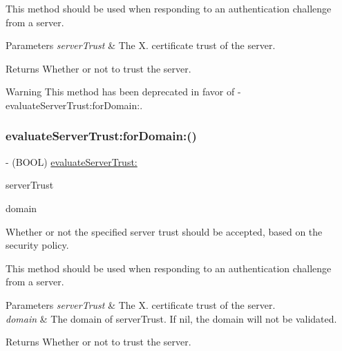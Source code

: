 This method should be used when responding to an authentication challenge from a server.


\begin{DoxyParams}{Parameters}
{\em server\+Trust} & The X. certificate trust of the server.\\
\hline
\end{DoxyParams}
\begin{DoxyReturn}{Returns}
Whether or not to trust the server.
\end{DoxyReturn}
\begin{DoxyWarning}{Warning}
This method has been deprecated in favor of {\ttfamily -\/evaluate\+Server\+Trust\+:for\+Domain\+:}. 
\end{DoxyWarning}
\mbox{\label{interface_a_f_security_policy_a892268d5a78bcf21d188486aca1aea56}} 
\subsubsection{\texorpdfstring{evaluate\+Server\+Trust\+:for\+Domain\+:()}{evaluateServerTrust:forDomain:()}\hspace{0.1cm}{\footnotesize\ttfamily [1/3]}}
{\footnotesize\ttfamily -\/ (B\+O\+OL) \mbox{\hyperlink{interface_a_f_security_policy_a404e83f245843cb7fd6408d5e9ee15e0}{evaluate\+Server\+Trust\+:}} \begin{DoxyParamCaption}\item[{(Sec\+Trust\+Ref)}]{server\+Trust }\item[{forDomain:(nullable N\+S\+String $\ast$)}]{domain }\end{DoxyParamCaption}}

Whether or not the specified server trust should be accepted, based on the security policy.

This method should be used when responding to an authentication challenge from a server.


\begin{DoxyParams}{Parameters}
{\em server\+Trust} & The X. certificate trust of the server. \\
\hline
{\em domain} & The domain of server\+Trust. If {\ttfamily nil}, the domain will not be validated.\\
\hline
\end{DoxyParams}
\begin{DoxyReturn}{Returns}
Whether or not to trust the server. 
\end{DoxyReturn}
\mbox{\label{interface_a_f_security_policy_a892268d5a78bcf21d188486aca1aea56}} 
